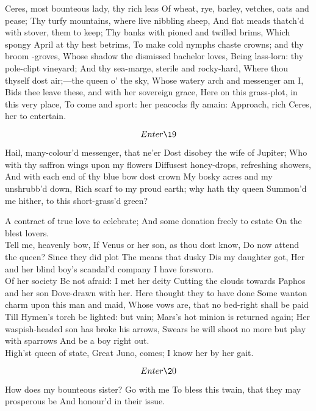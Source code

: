 \documentclass[11pt]{book}
\begin{document}
{ \Facies* {}


  Ceres, most bounteous lady, thy rich leas
	Of wheat, rye, barley, vetches, oats and pease;
	Thy turfy mountains, where live nibbling sheep,
	And flat meads thatch'd with stover, them to keep;
	Thy banks with pioned and twilled brims,
	Which spongy April at thy hest betrims,
	To make cold nymphs chaste crowns; and thy broom -groves,
	Whose shadow the dismissed bachelor loves,
	Being lass-lorn: thy pole-clipt vineyard;
	And thy sea-marge, sterile and rocky-hard,
	Where thou thyself dost air;---the queen o' the sky,
	Whose watery arch and messenger am I,
	Bids thee leave these, and with her sovereign grace,
	Here on this grass-plot, in this very place,
	To come and sport: her peacocks fly amain:
	Approach, rich Ceres, her to entertain.


	\[Enter \19\]


 Hail, many-colour'd messenger, that ne'er
	Dost disobey the wife of Jupiter;
	Who with thy saffron wings upon my flowers
	Diffusest honey-drops, refreshing showers,
	And with each end of thy blue bow dost crown
	My bosky acres and my unshrubb'd down,
	Rich scarf to my proud earth; why hath thy queen
	Summon'd me hither, to this short-grass'd green?

 A contract of true love to celebrate;
	And some donation freely to estate
	On the blest lovers. \\

                      Tell me, heavenly bow,
	If Venus or her son, as thou dost know,
	Do now attend the queen? Since they did plot
	The means that dusky Dis my daughter got,
	Her and her blind boy's scandal'd company
	I have forsworn. \\

                      Of her society
	Be not afraid: I met her deity
	Cutting the clouds towards Paphos and her son
	Dove-drawn with her. Here thought they to have done
	Some wanton charm upon this man and maid,
	Whose vows are, that no bed-right shall be paid
	Till Hymen's torch be lighted: but vain;
	Mars's hot minion is returned again;
	Her waspish-headed son has broke his arrows,
	Swears he will shoot no more but play with sparrows
	And be a boy right out. \\

                      High'st queen of state,
	Great Juno, comes; I know her by her gait.


	\[Enter \20\]

   How does my bounteous sister? Go with me
	To bless this twain, that they may prosperous be
	And honour'd in their issue.

}
\end{document}

